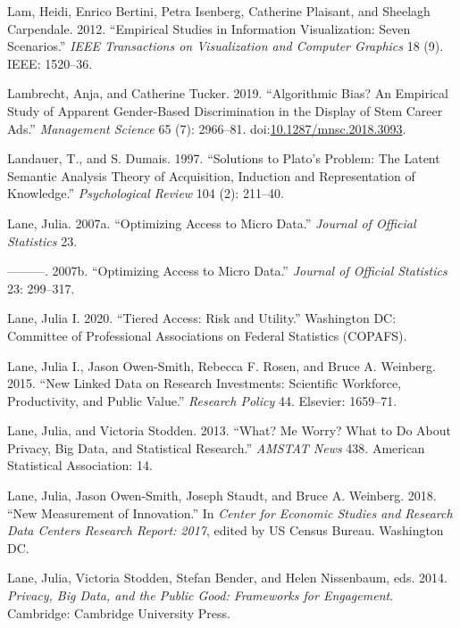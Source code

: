 \documentclass[]{krantz}
\begin{document}
\hypertarget{ref-lam2012empirical}{}
Lam, Heidi, Enrico Bertini, Petra Isenberg, Catherine Plaisant, and
Sheelagh Carpendale. 2012. ``Empirical Studies in Information
Visualization: Seven Scenarios.'' \emph{IEEE Transactions on
Visualization and Computer Graphics} 18 (9). IEEE: 1520--36.

\hypertarget{ref-lambrecht2019}{}
Lambrecht, Anja, and Catherine Tucker. 2019. ``Algorithmic Bias? An
Empirical Study of Apparent Gender-Based Discrimination in the Display
of Stem Career Ads.'' \emph{Management Science} 65 (7): 2966--81.
doi:\href{https://doi.org/10.1287/mnsc.2018.3093}{10.1287/mnsc.2018.3093}.

\hypertarget{ref-landauer-97}{}
Landauer, T., and S. Dumais. 1997. ``Solutions to Plato's Problem: The
Latent Semantic Analysis Theory of Acquisition, Induction and
Representation of Knowledge.'' \emph{Psychological Review} 104 (2):
211--40.

\hypertarget{ref-Lane2007a}{}
Lane, Julia. 2007a. ``Optimizing Access to Micro Data.'' \emph{Journal
of Official Statistics} 23.

\hypertarget{ref-Lane2007}{}
---------. 2007b. ``Optimizing Access to Micro Data.'' \emph{Journal of
Official Statistics} 23: 299--317.

\hypertarget{ref-Lane2020}{}
Lane, Julia I. 2020. ``Tiered Access: Risk and Utility.'' Washington DC:
Committee of Professional Associations on Federal Statistics (COPAFS).

\hypertarget{ref-lane2015new}{}
Lane, Julia I., Jason Owen-Smith, Rebecca F. Rosen, and Bruce A.
Weinberg. 2015. ``New Linked Data on Research Investments: Scientific
Workforce, Productivity, and Public Value.'' \emph{Research Policy} 44.
Elsevier: 1659--71.

\hypertarget{ref-lane2013me}{}
Lane, Julia, and Victoria Stodden. 2013. ``What? Me Worry? What to Do
About Privacy, Big Data, and Statistical Research.'' \emph{AMSTAT News}
438. American Statistical Association: 14.

\hypertarget{ref-Lane2018}{}
Lane, Julia, Jason Owen-Smith, Joseph Staudt, and Bruce A. Weinberg.
2018. ``New Measurement of Innovation.'' In \emph{Center for Economic
Studies and Research Data Centers Research Report: 2017}, edited by US
Census Bureau. Washington DC.

\hypertarget{ref-lane2014}{}
Lane, Julia, Victoria Stodden, Stefan Bender, and Helen Nissenbaum, eds.
2014. \emph{Privacy, Big Data, and the Public Good: Frameworks for
Engagement}. Cambridge: Cambridge University Press.
\end{document}

